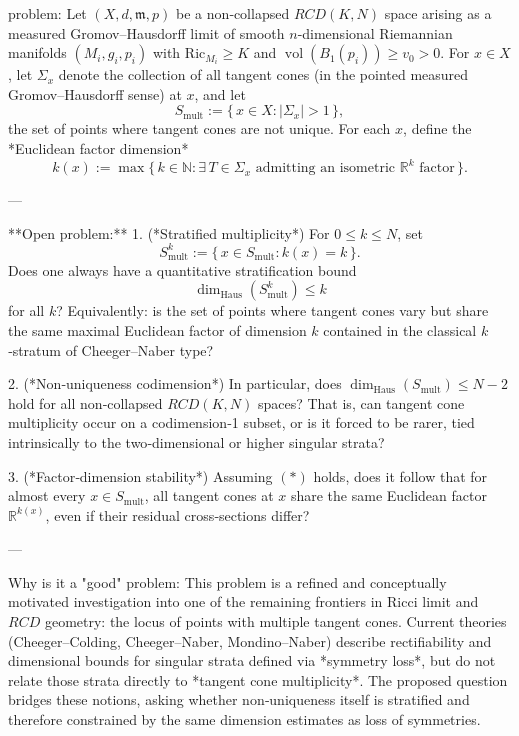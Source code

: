problem:  
Let \((X,d,\mathfrak{m},p)\) be a non‑collapsed \(RCD(K,N)\) space arising as a measured Gromov–Hausdorff limit of smooth \(n\)-dimensional Riemannian manifolds \((M_i,g_i,p_i)\) with  
\(\mathrm{Ric}_{M_i}\ge K\) and \(\operatorname{vol}(B_1(p_i))\ge v_0>0\).  
For \(x\in X\), let \(\Sigma_x\) denote the collection of all tangent cones (in the pointed measured Gromov–Hausdorff sense) at \(x\), and let  
\[
S_{\mathrm{mult}} := \{\,x\in X : |\Sigma_x|>1 \,\},
\]
the set of points where tangent cones are not unique.  
For each \(x\), define the *Euclidean factor dimension*
\[
k(x):=\max\{\,k\in\mathbb{N} : \exists\,T\in\Sigma_x\text{ admitting an isometric }\mathbb{R}^k\text{ factor}\,\}.
\]

---

**Open problem:**  
1. (*Stratified multiplicity*) For \(0\le k\le N\), set  
\[
S^{k}_{\mathrm{mult}} := \{\,x\in S_{\mathrm{mult}} : k(x)=k \,\}.
\]
Does one always have a quantitative stratification bound
\[
\dim_{\mathrm{Haus}}(S^{k}_{\mathrm{mult}}) \le k
\tag{*}
\]
for all \(k\)?  Equivalently: is the set of points where tangent cones vary but share the same maximal Euclidean factor of dimension \(k\) contained in the classical \(k\)‑stratum of Cheeger–Naber type?

2. (*Non‑uniqueness codimension*)  In particular, does \(\dim_{\mathrm{Haus}}(S_{\mathrm{mult}})\le N-2\) hold for all non‑collapsed \(RCD(K,N)\) spaces?  That is, can tangent cone multiplicity occur on a codimension‑1 subset, or is it forced to be rarer, tied intrinsically to the two‑dimensional or higher singular strata?

3. (*Factor‑dimension stability*)  Assuming \((*)\) holds, does it follow that for almost every \(x\in S_{\mathrm{mult}}\), all tangent cones at \(x\) share the same Euclidean factor \(\mathbb{R}^{k(x)}\), even if their residual cross‑sections differ?

---

Why is it a "good" problem:  
This problem is a refined and conceptually motivated investigation into one of the remaining frontiers in Ricci limit and \(RCD\) geometry: the locus of points with multiple tangent cones. Current theories (Cheeger–Colding, Cheeger–Naber, Mondino–Naber) describe rectifiability and dimensional bounds for singular strata defined via *symmetry loss*, but do not relate those strata directly to *tangent cone multiplicity*. The proposed question bridges these notions, asking whether non‑uniqueness itself is stratified and therefore constrained by the same dimension estimates as loss of symmetries.  

